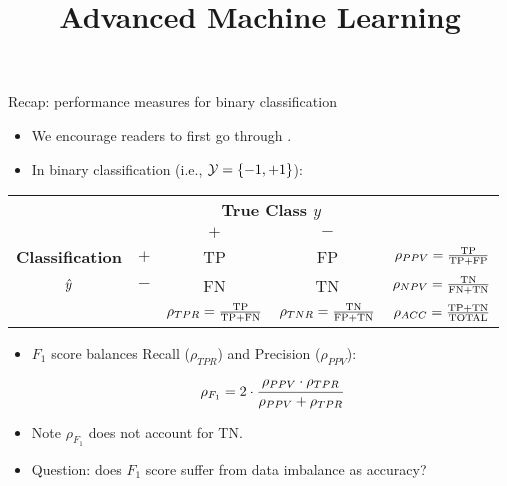 \documentclass[11pt,compress,t,notes=noshow, xcolor=table]{beamer}
\title{Advanced Machine Learning}
\date{}
\begin{document}



\sloppy

\begin{vbframe}{Recap: performance measures for binary classification}
    \footnotesize{
        \begin{itemize}
            \item We encourage readers to first go through \href{https://slds-lmu.github.io/i2ml/chapters/04_evaluation/04-08-measures-classification/}{}.
            \item In binary classification  (i.e., $\mathcal{Y} = \{-1,+1\}$):

		\end{itemize}
		
		\begin{center}
		\tiny
		\renewcommand{\arraystretch}{1.1}
		\begin{tabular}{cc||cc|c}
			& & \multicolumn{2}{c|}{\bfseries True Class $y$} & \\
			& & $+$ & $-$ & \\ 
			\hline \hline
			\bfseries Classification     & $+$ & TP & FP & $\rho_{PPV} = \frac{\text{TP}}{\text{TP} + \text{FP}}$\\
			$\hat{y}$ & $-$ & FN & TN & $\rho_{NPV} = \frac{\text{TN}}{\text{FN} + \text{TN}}$\\
			\hline
			& & $\rho_{TPR} = \frac{\text{TP}}{\text{TP} + \text{FN}}$ & $\rho_{TNR} = \frac{\text{TN}}{\text{FP} + \text{TN}}$ & $\rho_{ACC} = \frac{\text{TP}+ \text{TN}}{\text{TOTAL}}$
		\end{tabular}
		\renewcommand{\arraystretch}{1}
        \end{center}

        \begin{itemize}
            \item $F_1$ score balances Recall ($\rho_{TPR}$) and Precision ($\rho_{PPV}$):
            $$\rho_{F_1} = 2 \cdot \cfrac{\rho_{PPV} \cdot \rho_{TPR}}{\rho_{PPV} + \rho_{TPR}}$$
            
            \item Note $\rho_{F_1}$ does not account for TN.
            
            \item Question: does $F_1$ score suffer from data imbalance as accuracy?
        \end{itemize}
            
    }
    
\end{vbframe}
\end{document}
